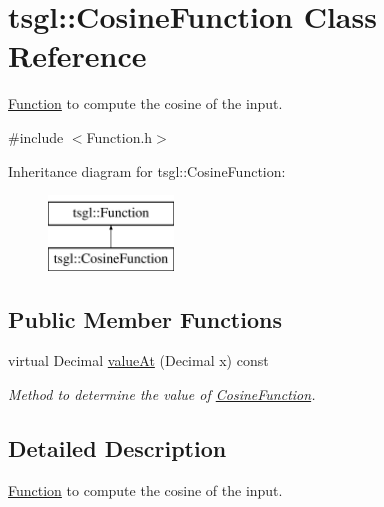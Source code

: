 \hypertarget{classtsgl_1_1_cosine_function}{\section{tsgl\-:\-:Cosine\-Function Class Reference}
\label{classtsgl_1_1_cosine_function}
}


\hyperlink{classtsgl_1_1_function}{Function} to compute the cosine of the input.  




{\ttfamily \#include $<$Function.\-h$>$}

Inheritance diagram for tsgl\-:\-:Cosine\-Function\-:\begin{figure}[H]
\begin{center}
\leavevmode
\includegraphics[height=2.000000cm]{classtsgl_1_1_cosine_function}
\end{center}
\end{figure}
\subsection*{Public Member Functions}
\begin{DoxyCompactItemize}
\item 
virtual Decimal \hyperlink{classtsgl_1_1_cosine_function_a69b67c247afe02895d35da9a99bc0ffd}{value\-At} (Decimal x) const 
\begin{DoxyCompactList}\small\item\em Method to determine the value of \hyperlink{classtsgl_1_1_cosine_function}{Cosine\-Function}. \end{DoxyCompactList}\end{DoxyCompactItemize}


\subsection{Detailed Description}
\hyperlink{classtsgl_1_1_function}{Function} to compute the cosine of the input. 

